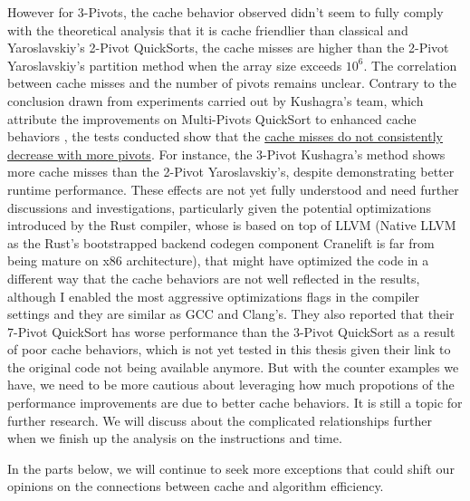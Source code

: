 \documentclass[a4paper,oneside,12pt]{book}
\begin{document}
However for 3-Pivots, the cache behavior observed didn't seem to fully comply with the theoretical analysis that it is cache friendlier than classical and Yaroslavskiy's 2-Pivot QuickSorts, 
the cache misses are higher than the 2-Pivot Yaroslavskiy's partition method when the array size exceeds $10^6$. The correlation between cache misses and the number of pivots remains unclear.
Contrary to the conclusion drawn from experiments carried out by Kushagra's team, which attribute the improvements on Multi-Pivots QuickSort to enhanced cache behaviors
\cite{Kushagra}, the tests conducted show that the \underline{cache misses do not consistently} \underline{decrease with more pivots}. For instance, the 3-Pivot Kushagra's method shows more cache misses than the 2-Pivot Yaroslavskiy's,
despite demonstrating better runtime performance. These effects are not yet fully understood and need further discussions and investigations, particularly given the potential optimizations introduced by the Rust compiler,
whose is based on top of LLVM (Native LLVM as the Rust's bootstrapped backend codegen component Cranelift is far from being mature on x86 architecture), that might have optimized the code in a different way that the cache behaviors are not well reflected in the results, although I enabled the most aggressive optimizations flags in the compiler settings
and they are similar as GCC and Clang's. They also reported that their 7-Pivot QuickSort has worse performance than the 3-Pivot QuickSort as a result of poor cache behaviors, which is not yet tested in this thesis given their link to the original code not being available anymore.
But with the counter examples we have, we need to be more cautious about leveraging how much propotions of the performance improvements are due to better cache behaviors. It is still a topic for further research.
We will discuss about the complicated relationships further when we finish up the analysis on the instructions and time.

In the parts below, we will continue to seek more exceptions that could shift our opinions on the connections between cache and algorithm efficiency.
\end{document}
